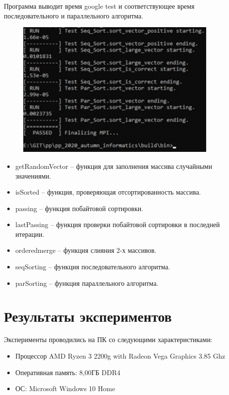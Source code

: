 \documentclass{report}
\begin{document}
\par Программа выводит время google test и соответствующее время последовательного и параллельного алгоритма.

\begin{figure}[htp]
    \centering
    \includegraphics[width=10cm]{images/image10.png}
    \label{fig:galaxy}
\end{figure}

\begin{itemize}

\item getRandomVector – функция для заполнения массива случайными значениями. 
\item isSorted – функция, проверяющая отсортированность массива.
\item passing – функция побайтовой сортировки.
\item lastPassing – функция проверки побайтовой сортировки в последней итерации.
\item orderedmerge – функция слияния 2-х массивов.
\item seqSorting – функция последовательного алгоритма.
\item parSorting – функция параллельного алгоритма.

\end{itemize}
\newpage

\section*{Результаты экспериментов}
Эксперименты проводились на ПК со следующими характеристиками:

\begin{itemize}
\item Процессор AMD Ryzen 3 2200g with Radeon Vega Graphics 3.85 Ghz
\item Оперативная память: 8,00ГБ DDR4
\item ОС: Microsoft Windows 10 Home
\end{itemize}
\end{document}
